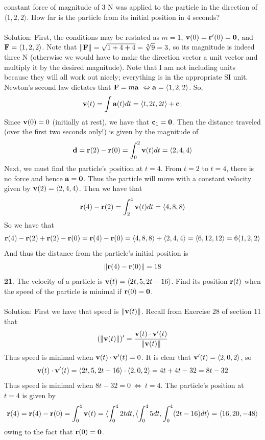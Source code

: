 \documentclass[12pt]{amsbook}
\newcommand{\la}{\langle}
\newcommand{\ra}{\rangle}
\begin{document}
constant force of magnitude of $3$ N was applied to the particle in the direction
of $\la 1,2,2\ra$. How far is the particle from its initial position in $4$ seconds?
\\
\\
{\sc Solution}: First, the conditions may be restated as $m=1$, ${\bf v}(0)={\bf r}'(0)={\bf 0}$, and ${\bf F}=\la 1,2,2 \ra$. Note that $\|{\bf F}\|=\sqrt{1+4+4}=\sqrt[2]{9}=3$, so its magnitude is indeed three N (otherwise we would have to make the direction vector a unit vector and multiply it by the desired magnitude). Note that I am not including units because they will all work out nicely; everything is in the appropriate SI unit. Newton's second law dictates that ${\bf F}=m{\bf a} \ \Leftrightarrow {\bf a}=\la 1,2,2 \ra$. So,
$${\bf v}(t)=\int {\bf a}(t)dt = \la t, 2t, 2t \ra +{\bf c}_1$$
Since ${\bf v}(0)=0$ (initially at rest), we have that ${\bf c}_1={\bf 0}$. Then the distance traveled (over the first two seconds only!) is given by the magnitude of 
$${\bf d}={\bf r}(2)-{\bf r}(0)=\int_0^2 {\bf v}(t)dt=\la 2, 4, 4 \ra$$
Next, we must find the particle's position at $t=4$. From $t=2$ to $t=4$, there is no force and hence ${\bf a}={\bf 0}$. Thus the particle will move with a constant velocity given by ${\bf v}(2)=\la 2,4,4 \ra$. Then we have that
$${\bf r}(4)-{\bf r}(2)=\int _2^4 {\bf v}(t)dt= \la 4,8,8 \ra$$
So we have that
$${\bf r}(4)-{\bf r}(2)+{\bf r}(2)-{\bf r}(0)={\bf r}(4)-{\bf r}(0)=\la 4,8,8 \ra + \la 2,4,4 \ra = \la 6,12,12 \ra=6\la 1,2,2 \ra$$
And thus the distance from the particle's initial position is
$$\|{\bf r}(4)-{\bf r}(0)\|=18$$
{\small\bf 21}. The velocity of a particle is ${\bf v}(t) = \la 2t, 5, 2t-16 \ra$. Find its position ${\bf r}(t)$ when the speed of the particle is minimal if ${\bf r}(0)={\bf 0}$. 
\\
\\
{\sc Solution}: First we have that speed is $\|{\bf v}(t)\|$. Recall from Exercise 28 of section 11 that
$$(\|{\bf v}(t)\|)'=\frac{{\bf v}(t)\cdot {\bf v}'(t)}{\|{\bf v}(t)\|}$$
Thus speed is minimal when ${\bf v}(t)\cdot {\bf v}'(t)=0$. It is clear that ${\bf v}'(t)=\la 2,0,2 \ra$, so
$${\bf v}(t)\cdot {\bf v}'(t)= \la 2t, 5, 2t-16 \ra \cdot \la 2,0,2 \ra = 4t+4t-32=8t-32$$
Thus speed is minimal when $8t-32=0 \ \Leftrightarrow \ t=4$. The particle's position at $t=4$ is given by
$${\bf r}(4)={\bf r}(4)-{\bf r}(0)=\int_0^4{\bf v}(t)=\la \int_0^4 2tdt,\la \int_0^4 5dt, \int_0^4 (2t-16)dt \ra = \la 16,20, -48 \ra$$ 
owing to the fact that ${\bf r}(0)={\bf 0}$.
\\
\end{document}

